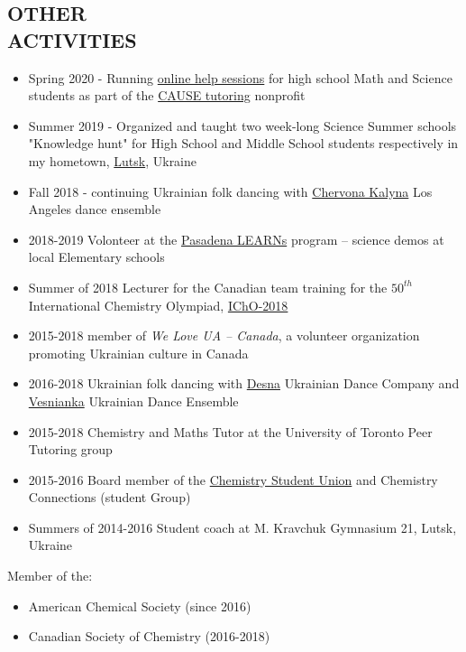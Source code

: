 \documentclass[9pt, margin]{res}
\begin{document}
\begin{resume}
\section{OTHER \\ ACTIVITIES} 

\begin{itemize}
	\item Spring 2020 - Running \href{https://causetutoring.org/online-extra-help-sessions-during-covid-19/}{online help sessions} for high school Math and Science students as part of the \href{https://causetutoring.org/}{CAUSE tutoring} nonprofit
	\item Summer 2019 - Organized and taught two week-long Science Summer schools "Knowledge hunt" for High School and Middle School students respectively in my hometown, \href{https://en.wikipedia.org/wiki/Lutsk}{Lutsk}, Ukraine
	\item Fall 2018 - continuing Ukrainian folk dancing with \href{https://kalyna.org/}{Chervona Kalyna} Los Angeles dance ensemble
	\item 2018-2019 Volonteer at the \href{https://www.caltechy.org/single-post/2019/05/01/Caltech-Y-Volunteers-Make-Science-Exciting-at-Elementary-School}{Pasadena LEARNs} program -- science demos at local Elementary schools
	\item Summer of 2018 Lecturer for the Canadian team training for the $50^{th}$ International Chemistry Olympiad, \href{https://50icho.eu}{IChO-2018} 
	\item 2015-2018 member of \textit{We Love UA -- Canada}, a volunteer organization promoting Ukrainian culture in Canada
	\item 2016-2018 Ukrainian folk dancing with \href{http://www.desna.ca}{Desna} Ukrainian Dance Company and \href{http://www.infoukes.com/vesnianka/}{Vesnianka} Ukrainian Dance Ensemble
	\item 2015-2018 Chemistry and Maths Tutor at the University of Toronto Peer Tutoring group 
	\item 2015-2016 Board member of the \href{http://csu.sa.utoronto.ca/exceutive-team-2015-2016/}{Chemistry Student Union} and Chemistry Connections (student Group)
	\item Summers of 2014-2016 Student coach at M. Kravchuk Gymnasium 21, Lutsk, Ukraine
\end{itemize}
Member of the:
\begin{itemize}
	\item American Chemical Society (since 2016)
	\item Canadian Society of Chemistry (2016-2018)
\end{itemize}

\end{resume}
\end{document}
